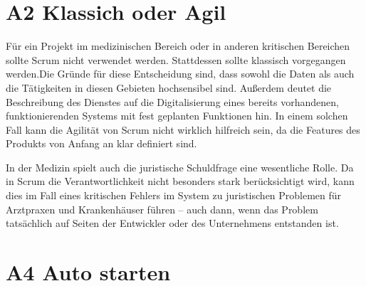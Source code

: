 \documentclass[12pt]{article}
\begin{document}
\section*{A2 Klassich oder Agil}

Für ein Projekt im medizinischen Bereich oder in anderen kritischen Bereichen sollte Scrum nicht verwendet werden. Stattdessen sollte klassisch 
vorgegangen werden.Die Gründe für diese Entscheidung sind, dass sowohl die Daten als auch die Tätigkeiten in diesen Gebieten 
hochsensibel sind. Außerdem deutet die Beschreibung des Dienstes auf die Digitalisierung eines bereits vorhandenen, funktionierenden Systems mit fest geplanten Funktionen hin. 
In einem solchen Fall kann die Agilität von Scrum nicht wirklich hilfreich sein, da die Features des Produkts von Anfang an klar definiert sind.

In der Medizin spielt auch die juristische Schuldfrage eine wesentliche Rolle. Da in Scrum die Verantwortlichkeit nicht besonders stark berücksichtigt wird, kann dies im 
Fall eines kritischen Fehlers im System zu juristischen Problemen für Arztpraxen und Krankenhäuser führen – auch dann, wenn das Problem tatsächlich auf Seiten der Entwickler oder des 
Unternehmens entstanden ist.

\section*{A4 Auto starten}
\end{document}
